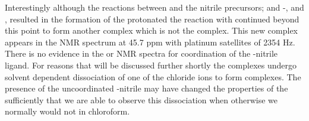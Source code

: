 Interestingly although the reactions between \tButhixantphos{} and the nitrile precursors; \cis{} and \trans{}-\ce{[Pt(MeCN)2Cl2]}, and \ce{[Pt(tBuCN)2Cl2]}, resulted in the formation of the protonated \tButhixantphos{} the reaction with \ce{[Pt(tBuCN)2Cl2]} continued beyond this point to form another complex which is not the \ce{[Pt(\tButhixantphos)Cl2]} complex.  This new complex appears in the \phosphorus{} NMR spectrum at 45.7 ppm with platinum satellites of 2354 Hz.  There is no evidence in the \proton{} or \carbon{} NMR spectra for coordination of the \tBu-nitrile ligand.  For reasons that will be discussed further shortly the \ce{[Pt(\tButhixantphos)Cl2]} complexes undergo solvent dependent dissociation of one of the chloride ions to form  complexes.  The presence of the uncoordinated \tBu-nitrile may have changed the properties of the  sufficiently that we are able to observe this dissociation when otherwise we normally would not in chloroform.

